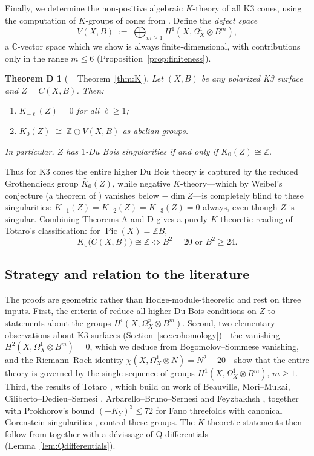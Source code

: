\documentclass[11pt]{amsart}
\numberwithin{equation}{section}
\theoremstyle{plain}
\newtheorem*{theoremD}{Theorem D}
\theoremstyle{definition}
\theoremstyle{remark}
\newcommand{\CC}{\mathbb{C}}
\newcommand{\ZZ}{\mathbb{Z}}
\newcommand{\Pic}{\operatorname{Pic}}
\newcommand{\Kzero}{K_0}
\begin{document}
Finally, we determine the non-positive algebraic $K$-theory of all K3 cones, using the computation of $K$-groups of cones from \cite{CHWW,PS}.
Define the \emph{defect space}
\[
V(X,B)\;:=\;\bigoplus_{m\ge 1}H^1\!\left(X,\Omega^1_X\otimes B^{m}\right),
\]
a $\CC$-vector space which we show is always finite-dimensional, with contributions only in the range $m\le 6$ (Proposition~\ref{prop:finiteness}).

\begin{theoremD}[= Theorem~\ref{thm:K}]
Let $(X,B)$ be any polarized K3 surface and $Z=C(X,B)$. Then:
\begin{enumerate}
\item $K_{-\ell}(Z)=0$ for all $\ell\ge 1$;
\item $\Kzero(Z)\;\cong\;\ZZ\oplus V(X,B)$ as abelian groups.
\end{enumerate}
In particular, $Z$ has $1$-Du Bois singularities if and only if $\Kzero(Z)\cong\ZZ$.
\end{theoremD}

Thus for K3 cones the entire higher Du Bois theory is captured by the reduced Grothendieck group $\widetilde{\Kzero}(Z)$, while negative $K$-theory---which by Weibel's conjecture (a theorem of \cite{CHSW}) vanishes below $-\dim Z$---is completely blind to these singularities: $K_{-1}(Z)=K_{-2}(Z)=K_{-3}(Z)=0$ always, even though $Z$ is singular.
Combining Theorems A and D gives a purely $K$-theoretic reading of Totaro's classification: for $\Pic(X)=\ZZ B$,
\[
\Kzero\big(C(X,B)\big)\cong\ZZ \iff B^2=20 \text{ or } B^2\ge 24 .
\]

\subsection*{Strategy and relation to the literature}
The proofs are geometric rather than Hodge-module-theoretic and rest on three inputs.
First, the criteria of \cite[Prop.~F]{SVV} reduce all higher Du Bois conditions on $Z$ to statements about the groups $H^i(X,\Omega^p_X\otimes B^m)$.
Second, two elementary observations about K3 surfaces (Section~\ref{sec:cohomology})---the vanishing $H^2(X,\Omega^1_X\otimes B^m)=0$, which we deduce from Bogomolov--Sommese vanishing, and the Riemann--Roch identity $\chi(X,\Omega^1_X\otimes N)=N^2-20$---show that the entire theory is governed by the single sequence of groups $H^1(X,\Omega^1_X\otimes B^m)$, $m\ge1$.
Third, the results of Totaro \cite{Tot}, which build on work of Beauville, Mori--Mukai, Ciliberto--Dedieu--Sernesi \cite{CDS}, Arbarello--Bruno--Sernesi \cite{ABS} and Feyzbakhsh \cite{Fey}, together with Prokhorov's bound $(-K_Y)^3\le 72$ for Fano threefolds with canonical Gorenstein singularities \cite{Pro}, control these groups.
The $K$-theoretic statements then follow from \cite{CHWW,PS} together with a d\'evissage of Q-differentials (Lemma~\ref{lem:Qdifferentials}).
\end{document}
